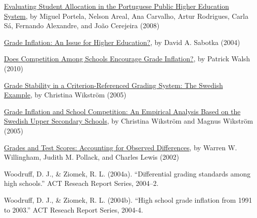 \documentclass{article}
\begin{document}
\vspace{5pt} \href{https://link.springer.com/article/10.1007/s10734-007-9097-x}{Evaluating Student Allocation in the Portuguese Public Higher Education System}, by Miguel Portela, Nelson Areal, Ana Carvalho, Artur Rodrigues, Carla Sá, Fernando Alexandre, and João Cerejeira (2008)

\vspace{5pt} \href{https://www.sciencedirect.com/science/article/pii/S0272775704000895}{Grade Inflation: An Issue for Higher Education?}, by David A. Sabotka (2004)

\vspace{5pt} \href{https://www.tandfonline.com/doi/abs/10.1080/15582159.2010.483918}{Does Competition Among Schools Encourage Grade Inflation?}, by Patrick Walsh (2010)

\vspace{5pt} \href{https://www.tandfonline.com/doi/full/10.1080/09695940500143811}{Grade Stability in a Criterion-Referenced Grading System: The Swedish Example}, by Christina Wikström (2005)

\vspace{5pt} \href{https://www.sciencedirect.com/science/article/pii/S0272775704000895}{Grade Inflation and School Competition: An Empirical Analysis Based on the Swedish Upper Secondary Schools}, by Christina Wikström and Magnus Wikström (2005)

\vspace{5pt} \href{https://onlinelibrary.wiley.com/doi/10.1111/j.1745-3984.2002.tb01133.x}{Grades and Test Scores: Accounting for Observed Differences}, by Warren W. Willingham, Judith M. Pollack, and Charles Lewis (2002)

Woodruff, D. J., \& Ziomek, R. L. (2004a). “Differential grading standards among high schools.” ACT Reseach Report Series, 2004–2.

Woodruff, D. J., \& Ziomek, R. L. (2004b). “High school grade inflation from 1991 to 2003.” ACT Reseach Report Series, 2004-4.



\newpage
%


\end{document}
